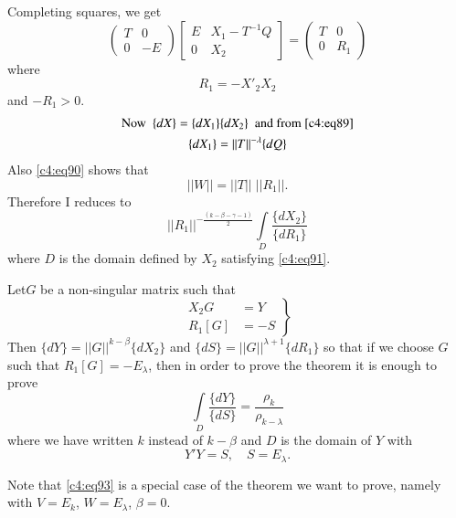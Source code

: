 Completing squares, we get
\begin{equation*}
\begin{pmatrix}
T & 0\\
0 & -E
\end{pmatrix}
\begin{bmatrix}
E & X_{1}-T^{-1}Q\\
0 & X_{2}
\end{bmatrix}
=
\begin{pmatrix}
T & 0\\
0 & R_{1}
\end{pmatrix}\tag{90}\label{c4:eq90}
\end{equation*}
where
\begin{equation*}
R_{1}=-X'_{2}X_{2}\tag{91}\label{c4:eq91}
\end{equation*}
and $-R_{1}>0$.
\begin{gather*}
\text{Now \ } \{dX\}=\{dX_{1}\}\{dX_{2}\}\text{ \ and from
  \eqref{c4:eq89}}\\
\{dX_{1}\}=||T||^{-\lambda}\{dQ\}
\end{gather*}
Also \eqref{c4:eq90} shows that
$$
||W||=||T||\;||R_{1}||.
$$
Therefore I reduces to
$$
||R_{1}||^{-\frac{(k-\beta-\gamma-1)}{2}}\int\limits_{D}\frac{\{dX_{2}\}}{\{dR_{1}\}} 
$$
where $D$ is the domain defined by $X_{2}$ satisfying \eqref{c4:eq91}.

Let\pageoriginale $G$ be a non-singular matrix such that
\begin{equation*}
\left.
\begin{aligned}
X_{2}G &= Y\\
R_{1}[G] &= -S
\end{aligned}
\right\}\tag{92}\label{c4:eq92}
\end{equation*}
Then $\{dY\}=||G||^{k-\beta}\{dX_{2}\}$ and
$\{dS\}=||G||^{\lambda+1}\{dR_{1}\}$ so that if we choose $G$ such
that $R_{1}[G]=-E_{\lambda}$, then in order to prove the theorem it is
enough to prove
\begin{equation*}
\int\limits_{D}\frac{\{dY\}}{\{dS\}}=\frac{\rho_{k}}{\rho_{k-\lambda}}\tag{93}\label{c4:eq93} 
\end{equation*}
where we have written $k$ instead of $k-\beta$ and $D$ is the domain
of $Y$ with
\begin{equation*}
Y'Y=S,\quad S=E_{\lambda}.\tag{94}\label{c4:eq94}
\end{equation*}

Note that \eqref{c4:eq93} is a special case of the theorem we want to
prove, namely with $V=E_{k}$, $W=E_{\lambda}$, $\beta=0$.

